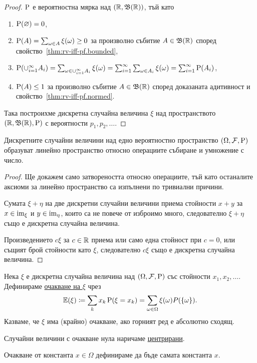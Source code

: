 \documentclass[numbers=endperiod, DIV=15, bibliography=totocnumbered]{scrartcl}
\begin{document}
\begin{proof}
  $\operatorname{P}$ е вероятностна мярка над $(\mathbb{R}, \mathfrak{B}(\mathbb{R}))$, тъй като
  \begin{enumerate}
    \item $\operatorname{P}(\varnothing) = 0$,
    \item $\operatorname{P}(A) = \sum_{\omega \in A} \xi(\omega) \geq 0$ за произволно събитие $A \in \mathfrak{B}(\mathbb{R})$ според свойство~\ref{thm:rv-iff-pf.bounded},
    \item $\operatorname{P}(\cup_{i=1}^\infty A_i) = \sum_{\omega \in \cup_{i=1}^\infty A_i} \xi(\omega) = \sum_{i=1}^\infty \sum_{\omega \in A_i} \xi(\omega) = \sum_{i=1}^\infty \operatorname{P}(A_i)$,
    \item $\operatorname{P}(A) \leq 1$ за произволно събитие $A \in \mathfrak{B}(\mathbb{R})$ според доказаната адитивност и свойство~\ref{thm:rv-iff-pf.normed}.
  \end{enumerate}
  Така построихме дискретна случайна величина $\xi$ над пространството $(\mathbb{R}, \mathfrak{B}(\mathbb{R}), \operatorname{P})$ с вероятности $p_1, p_2, \ldots$.
\end{proof}

\begin{proposition}
  Дискретните случайни величини над едно вероятностно пространство $(\Omega, \mathcal{F}, \operatorname{P})$ образуват линейно пространство относно операциите събиране и умножение с число.
\end{proposition}
\begin{proof}
  Ще докажем само затвореността относно операциите, тъй като останалите аксиоми за линейно пространство са изпълнени по тривиални причини.

  Сумата $\xi + \eta$ на две дискретни случайни величини приема стойности $x + y$ за $x \in \operatorname{im}_\xi$ и $y \in \operatorname{im}_\eta$, които са не повече от изброимо много, следователно $\xi + \eta$ също е дискретна случайна величина.

  Произведението $c \xi$ за $c \in \mathbb{R}$ приема или само една стойност при $c = 0$, или същият брой стойности като $\xi$, следователно $c \xi$ също е дискретна случайна величина.
\end{proof}

\begin{definition}
  Нека $\xi$ е дискретна случайна величина над $(\Omega, \mathcal{F}, \operatorname{P})$ със стойности $x_1, x_2, \ldots$. Дефинираме \underline{очакване на $\xi$} чрез
  \begin{displaymath}
    \mathbb{E}(\xi) \coloneqq \sum_k x_k \operatorname{P}(\xi = x_k) = \sum_{\omega \in \Omega} \xi(\omega) P(\{ \omega \}).
  \end{displaymath}
  Казваме, че $\xi$ има (крайно) очакване, ако горният ред е абсолютно сходящ.

  Случайни величини с очакване нула наричаме \underline{центрирани}.

  Очакване от константа $x \in \Omega$ дефинираме да бъде самата константа $x$.
\end{definition}
\end{document}
